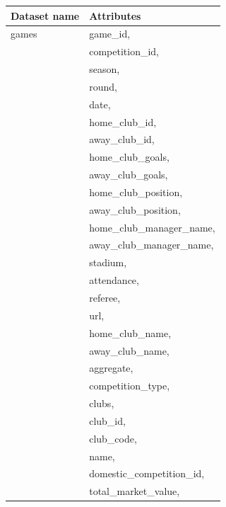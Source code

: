 \documentclass{Configuration_Files/PoliMi3i_thesis}
\begin{document}
\begin{tabular}{|l|p{13cm}|}
	\hline
	\textbf{Dataset name} & \textbf{Attributes}                       \\
	\hline
    games
    & game\_id,                                 \\
    & competition\_id,                          \\
    & season,                                   \\
    & round,                                    \\
    & date,                                     \\
    & home\_club\_id,                           \\
    & away\_club\_id,                           \\
    & home\_club\_goals,                        \\
    & away\_club\_goals,                        \\
    & home\_club\_position,                     \\
    & away\_club\_position,                     \\
    & home\_club\_manager\_name,                \\
    & away\_club\_manager\_name,                \\
    & stadium,                                  \\
    & attendance,                               \\
    & referee,                                  \\
    & url,                                      \\
    & home\_club\_name,                         \\
    & away\_club\_name,                         \\
    & aggregate,                                \\
    & competition\_type,                        \\
    & clubs,                                    \\
    & club\_id,                                 \\
    & club\_code,                               \\
    & name,                                     \\
    & domestic\_competition\_id,                \\
    & total\_market\_value,                     \\

\end{tabular}
\end{document}
